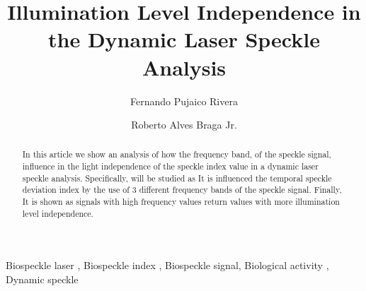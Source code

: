 \documentclass[review]{elsarticle}
\begin{document}
 

\begin{frontmatter}

\title{Illumination Level Independence in the Dynamic Laser Speckle Analysis}



\author{Fernando Pujaico Rivera}
\author{Roberto Alves Braga Jr.}



\address{University Federal of Lavras, Lavras, Brazil}
% 


\begin{abstract}
In this article we show an analysis of how the frequency band,
of the speckle signal, influence in the
light independence of the speckle index value in a dynamic laser speckle analysis. 
Specifically, 
will be studied as It is influenced the temporal speckle deviation 
index by the use of 3 different frequency bands of the speckle signal.
Finally, It is shown as signals with high frequency values
return values with more illumination level independence.
\end{abstract}

\begin{keyword}
Biospeckle laser \sep 
Biospeckle index \sep 
Biospeckle signal\sep 
Biological activity \sep
Dynamic speckle 
\end{keyword}

\end{frontmatter}

\linenumbers

\end{document}
